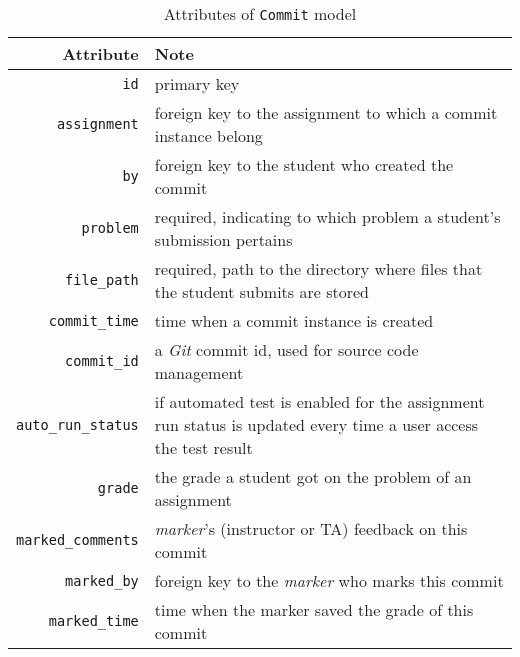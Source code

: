 \begin{table}[ht]
    \centering
    \caption{Attributes of \texttt{Commit} model}
    \label{tab:COMMIT_ATTR}
    \renewcommand{\arraystretch}{1.3}
    \begin{tabular}[ht]{r|p{4in}}
        \hline
        Attribute & Note \\
        \hline
        \hline

        \texttt{id} & primary key \\
        \hline
        \texttt{assignment} & foreign key to the assignment to which a commit
            instance belong \\
        \hline
        \texttt{by} & foreign key to the student who created the commit \\
        \hline
        \hline

        \texttt{problem} & required, indicating to which problem a student's
            submission pertains \\
        \hline
        \texttt{file\_path} & required, path to the directory where files that
            the student  submits are stored \\
        \hline
        \texttt{commit\_time} & time when a commit instance is created \\
        \hline
        \texttt{commit\_id} & a \emph{Git} commit id, used for source code 
            management \\
        \hline
        \texttt{auto\_run\_status} & if automated test is enabled for the
            assignment 
            run status  is updated every time a user access the test result \\
        \hline
        \hline

        \texttt{grade} & the grade a student got on the problem of an assignment \\
        \hline
        \texttt{marked\_comments} & \emph{marker}'s (instructor or TA) feedback on
            this commit \\
        \hline
        \texttt{marked\_by} & foreign key to the \emph{marker} who marks this commit \\
        \hline
        \texttt{marked\_time} & time when the marker saved the grade of this
            commit \\
        \hline
    \end{tabular}
    \renewcommand{\arraystretch}{1}
\end{table}


